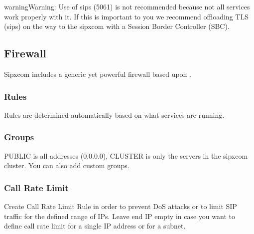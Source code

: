 \documentclass[letterpaper,10pt,english]{sphinxmanual}
\begin{document}
\begin{sphinxadmonition}{warning}{Warning:}
Use of sips (5061) is not recommended because not all services work properly with it. If this is important to you we recommend offloading TLS (sips) on the way to the sipxcom with a Session Border Controller (SBC).
\end{sphinxadmonition}



\subsection{Firewall}
\label{\detokenize{webui:firewall}}\label{\detokenize{webui:id24}}
Sipxcom includes a generic yet powerful firewall based upon .


\subsubsection{Rules}
\label{\detokenize{webui:rules}}
Rules are determined automatically based on what services are running.
\begin{quote}

\end{quote}


\subsubsection{Groups}
\label{\detokenize{webui:groups}}
PUBLIC is all addresses (0.0.0.0), CLUSTER is only the servers in the sipxcom cluster. You can also add custom groups.
\begin{quote}

\end{quote}


\subsubsection{Call Rate Limit}
\label{\detokenize{webui:call-rate-limit}}
Create Call Rate Limit Rule in order to prevent DoS attacks or to limit SIP traffic for the defined range of IPs. Leave end IP empty in case you want to define call rate limit for a single IP address or for a subnet.
\begin{quote}

\end{quote}
\end{document}
